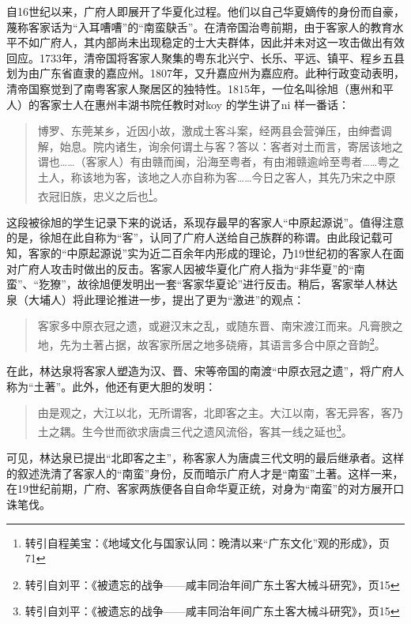 自16世纪以来，广府人即展开了华夏化过程。他们以自己华夏嫡传的身份而自豪，蔑称客家话为“入耳嘈嘈”的“南蛮鴃舌”。在清帝国治粤前期，由于客家人的教育水平不如广府人，其内部尚未出现稳定的士大夫群体，因此并未对这一攻击做出有效回应。1733年，清帝国将客家人聚集的粤东北兴宁、长乐、平远、镇平、程乡五县划为由广东省直隶的嘉应州。1807年，又升嘉应州为嘉应府。此种行政变动表明，清帝国察觉到了南粤客家人聚居区的独特性。1815年，一位名叫徐旭（惠州和平人）的客家士人在惠州丰湖书院任教时对koy 的学生讲了ni 样一番话：

\begin{quote}
	

博罗、东莞某乡，近因小故，激成土客斗案，经两县会营弹压，由绅耆调解，始息。院内诸生，询余何谓土与客？答以：客者对土而言，寄居该地之谓也……（客家人）有由赣而闽，沿海至粤者，有由湘赣逾岭至粤者……粤之土人，称该地为客，该地之人亦自称为客……今日之客人，其先乃宋之中原衣冠旧族，忠义之后也\footnote{转引自程美宝：《地域文化与国家认同：晚清以来“广东文化”观的形成》，页71}。
\end{quote}

这段被徐旭的学生记录下来的说话，系现存最早的客家人“中原起源说”。值得注意的是，徐旭在此自称为“客”，认同了广府人送给自己族群的称谓。由此段记载可知，客家的“中原起源说”实为近二百余年内形成的理论，乃19世纪初的客家人在面对广府人攻击时做出的反击。客家人因被华夏化广府人指为“非华夏”的“南蛮”、“犵獠”，故徐旭便发明出一套“客家华夏论”进行反击。稍后，客家举人林达泉（大埔人）将此理论推进一步，提出了更为“激进”的观点：

\begin{quote}
客家多中原衣冠之遗，或避汉末之乱，或随东晋、南宋渡江而来。凡膏腴之地，先为土著占据，故客家所居之地多硗瘠，其语言多合中原之音韵\footnote{转引自刘平：《被遗忘的战争——咸丰同治年间广东土客大械斗研究》，页15}。
\end{quote}

在此，林达泉将客家人塑造为汉、晋、宋等帝国的南渡“中原衣冠之遗”，将广府人称为“土著”。此外，他还有更大胆的发明：

\begin{quote}
由是观之，大江以北，无所谓客，北即客之主。大江以南，客无异客，客乃土之耦。生今世而欲求唐虞三代之遗风流俗，客其一线之延也\footnote{转引自刘平：《被遗忘的战争——咸丰同治年间广东土客大械斗研究》，页15}。
\end{quote}

可见，林达泉已提出“北即客之主”，称客家人为唐虞三代文明的最后继承者。这样的叙述洗清了客家人的“南蛮”身份，反而暗示广府人才是“南蛮”土著。这样一来，在19世纪前期，广府、客家两族便各自自命华夏正统，对身为“南蛮”的对方展开口诛笔伐。

